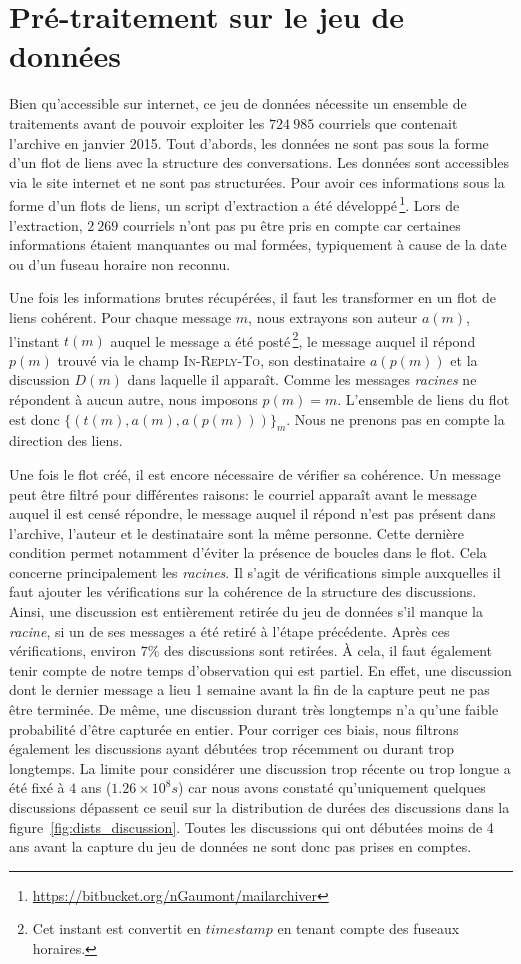 \section{Pré-traitement sur le jeu de données}
Bien qu'accessible sur internet, ce jeu de données nécessite un ensemble de traitements avant de pouvoir exploiter les $724\ 985$ courriels que contenait l'archive en janvier 2015.
Tout d'abords, les données ne sont pas sous la forme d'un flot de liens avec la structure des conversations.
Les données sont accessibles via le site internet et ne sont pas structurées.
Pour avoir ces informations sous la forme d'un flots de liens, un script d'extraction a été développé\,\footnote{\url{https://bitbucket.org/nGaumont/mailarchiver}}.
Lors de l'extraction, $2\ 269$ courriels n'ont pas pu être pris en compte car certaines informations étaient manquantes ou mal formées, typiquement à cause de la date ou d'un fuseau horaire non reconnu.

Une fois les informations brutes récupérées, il faut les transformer en un flot de liens cohérent.
Pour chaque message $m$, nous extrayons son auteur $a(m)$, l'instant $t(m)$ auquel le message a été posté\,\footnote{Cet instant est convertit en $timestamp$ en tenant compte des fuseaux horaires.}, le message auquel il répond $p(m)$ trouvé via le champ \textsc{In-Reply-To}, son destinataire $a(p(m))$ et la discussion $D(m)$ dans laquelle il apparaît.
Comme les messages \emph{racines} ne répondent à aucun autre, nous imposons $p(m)=m$.
L'ensemble de liens du flot est donc $\{(t(m),a(m),a(p(m)))\}_m$.
Nous ne prenons pas en compte la direction des liens.

Une fois le flot créé, il est encore nécessaire de vérifier sa cohérence.
Un message peut être filtré pour différentes raisons: le courriel apparaît avant le message auquel il est censé répondre, le message auquel il répond n'est pas présent dans l'archive, l'auteur et le destinataire sont la même personne.
Cette dernière condition permet notamment d'éviter la présence de boucles dans le flot.
Cela concerne principalement les \emph{racines}.
Il s'agit de vérifications simple auxquelles il faut ajouter les vérifications sur la cohérence de la structure des discussions.
Ainsi, une discussion est entièrement retirée du jeu de données s'il manque la \emph{racine}, si un de ses messages a été retiré à l'étape précédente.
Après ces vérifications, environ $7\%$ des discussions sont retirées.
\`A cela, il faut également tenir compte de notre temps d'observation qui est partiel.
En effet, une discussion dont le dernier message a lieu 1 semaine avant la fin de la capture peut ne pas être terminée.
De même, une discussion durant très longtemps n'a qu'une faible probabilité d'être capturée en entier.
Pour corriger ces biais, nous filtrons également les discussions ayant débutées trop récemment ou durant trop longtemps.
La limite pour considérer une discussion trop récente ou trop longue a été fixé à $4$ ans ($1.26\times 10^8 s$) car nous avons constaté qu'uniquement quelques discussions dépassent ce seuil sur la distribution de durées des discussions dans la figure~\ref{fig:dists_discussion}.
Toutes les discussions qui ont débutées moins de 4 ans avant la capture du jeu de données ne sont donc pas prises en comptes.


